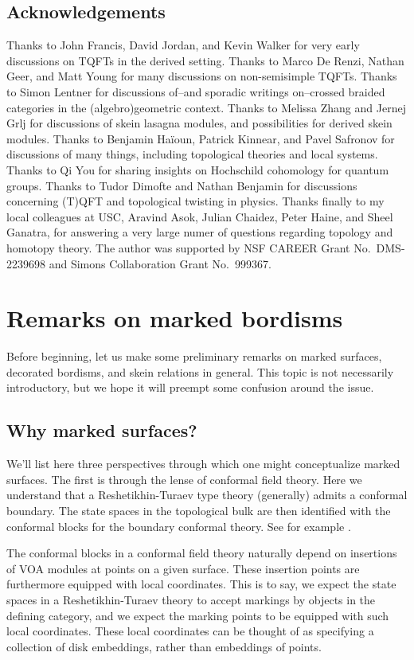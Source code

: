 \documentclass[reqno]{amsart}
\theoremstyle{definition}
\renewcommand{\1}{\mathbf{1}}
\begin{document}
\subsection{Acknowledgements}
Thanks to John Francis, David Jordan, and Kevin Walker for very early discussions on TQFTs in the derived setting. Thanks to Marco De Renzi, Nathan Geer, and Matt Young for many discussions on non-semisimple TQFTs. Thanks to Simon Lentner for discussions of--and sporadic writings on--crossed braided categories in the (algebro)geometric context. Thanks to Melissa Zhang and Jernej Grlj for discussions of skein lasagna modules, and possibilities for derived skein modules. Thanks to Benjamin Ha\"ioun, Patrick Kinnear, and Pavel Safronov for discussions of many things, including topological theories and local systems. Thanks to Qi You for sharing insights on Hochschild cohomology for quantum groups. Thanks to Tudor Dimofte and Nathan Benjamin for discussions concerning (T)QFT and topological twisting in physics. Thanks finally to my local colleagues at USC, Aravind Asok, Julian Chaidez, Peter Haine, and Sheel Ganatra, for answering a very large numer of questions regarding topology and homotopy theory. The author was supported by NSF CAREER Grant No.\ DMS-2239698 and Simons Collaboration Grant No.\ 999367.

\section{Remarks on marked bordisms}
\label{sect:skein_bordisms}

Before beginning, let us make some preliminary remarks on marked surfaces, decorated bordisms, and skein relations in general. This topic is not necessarily introductory, but we hope it will preempt some confusion around the issue.

\subsection{Why marked surfaces?} We'll list here three perspectives through which one might conceptualize marked surfaces. The first is through the lense of conformal field theory. Here we understand that a Reshetikhin-Turaev type theory (generally) admits a conformal boundary. The state spaces in the topological bulk are then identified with the conformal blocks for the boundary conformal theory. See for example \cite{fuchsrunkelschweigert02,runkel}.
\par

The conformal blocks in a conformal field theory naturally depend on insertions of VOA modules at points on a given surface. These insertion points are furthermore equipped with local coordinates. This is to say, we expect the state spaces in a Reshetikhin-Turaev theory to accept markings by objects in the defining category, and we expect the marking points to be equipped with such local coordinates. These local coordinates can be thought of as specifying a collection of disk embeddings, rather than embeddings of points.
\par
\end{document}
